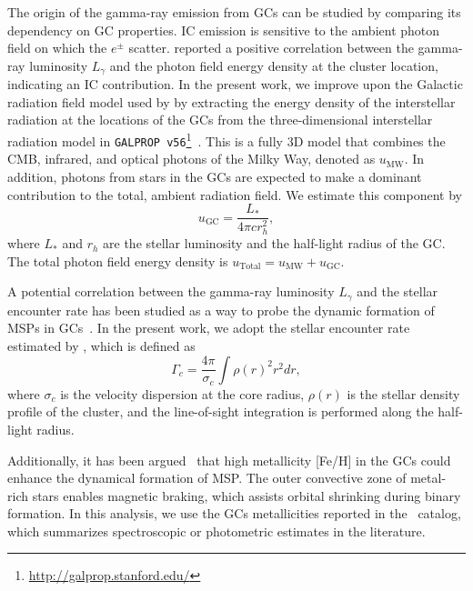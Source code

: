 \documentclass[doublespace,nopageskip]{VTthesis} %
\begin{document}
The origin of the gamma-ray emission from GCs can be studied by comparing its dependency on GC properties. IC emission is sensitive to the ambient photon field on which the $e^\pm$ scatter. \citet{2011ApJ...726..100H} reported a positive correlation between the gamma-ray luminosity $L_\gamma$ and the photon field energy density at the cluster location, indicating an IC contribution. In the present work, we improve upon the Galactic radiation field model used by \citet{2011ApJ...726..100H} by extracting the energy density of the interstellar radiation at the locations of the GCs from the three-dimensional interstellar radiation model in \texttt{GALPROP v56}\footnote{\url{http://galprop.stanford.edu/}}~\citep{2017ApJ...846...67P,2018ApJ...856...45J}. This is a fully 3D model that combines the CMB, infrared, and optical photons of the Milky Way, denoted as $u_\text{MW}$. In addition, photons from stars in the GCs are expected to make a dominant contribution to the total, ambient radiation field. We estimate this component by
\begin{equation}
    u_{\text{GC}} = \dfrac{L_*}{4\pi c r_h^2},
    \label{eq:GCRF}
\end{equation}
where $L_*$ and $r_h$ are the stellar luminosity and the half-light radius of the GC. The total photon field energy density is $u_\text{Total} = u_\text{MW} + u_\text{GC}$.

A potential correlation between the gamma-ray luminosity $L_\gamma$ and the stellar encounter rate has been studied as a way to probe the dynamic formation of MSPs in GCs~\citep{2010A&A...524A..75A,2011ApJ...726..100H,2019MNRAS.486..851D}. In the present work, we adopt the stellar encounter rate estimated by \citet{2013ApJ...766..136B}, which is defined as
\begin{equation}
    \Gamma_c = \frac{4\pi}{\sigma_c}\int\rho(r)^2 r^2dr,
	\label{eq:encounter}
\end{equation}
where $\sigma_c$ is the velocity dispersion at the core radius, $\rho(r)$ is the stellar density profile of the cluster, and the line-of-sight integration is performed along the half-light radius. 

Additionally, it has been argued~\citep{2011ApJ...726..100H,2019MNRAS.486..851D} that high metallicity [Fe/H] in the GCs could enhance the dynamical formation of MSP. The outer convective zone of metal-rich stars enables magnetic braking, which assists orbital shrinking during binary formation. In this analysis, we use the GCs metallicities  reported in the~\citet{1996AJ....112.1487H} catalog, which summarizes  spectroscopic or photometric estimates in the literature.
\end{document}
